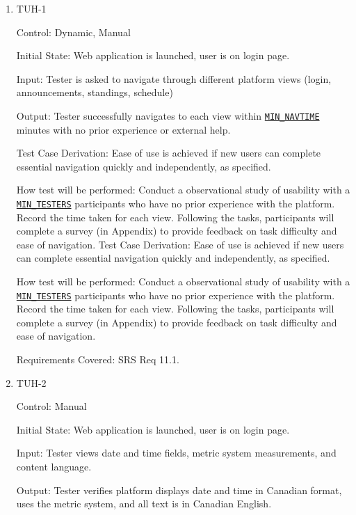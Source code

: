 \documentclass[12pt, titlepage]{article}
\begin{document}
\begin{enumerate}

  \item{TUH-1\\}

        Control: Dynamic, Manual

        Initial State:  Web application is launched, user is on login page.

        Input: Tester is asked to navigate through different platform views (login, announcements, standings, schedule)

        Output: Tester successfully navigates to each view within \hyperref[MIN_NAVTIME]{\texttt{MIN\_NAVTIME}} minutes with no prior experience or external help.

        Test Case Derivation: Ease of use is achieved if new users can complete essential navigation quickly and independently, as specified.

        How test will be performed: Conduct a observational study of usability with a \hyperref[MIN_TESTERS]{\texttt{MIN\_TESTERS}} participants who have no prior experience with the platform. Record the time taken for each view. Following the tasks, participants will complete a survey (in Appendix) to provide feedback on task difficulty and ease of navigation.
Test Case Derivation: Ease of use is achieved if new users can complete essential navigation quickly and independently, as specified.
					
How test will be performed: Conduct a observational study of usability with a \hyperref[MIN_TESTERS]{\texttt{MIN\_TESTERS}} participants who have no prior experience with the platform. Record the time taken for each view. Following the tasks, participants will complete a survey (in Appendix) to provide feedback on task difficulty and ease of navigation.

Requirements Covered: SRS Req 11.1.

\item{TUH-2\\}

        Control: Manual

        Initial State:  Web application is launched, user is on login page.

        Input: Tester views date and time fields, metric system measurements, and content language.

        Output: Tester verifies platform displays date and time in Canadian format, uses the metric system, and all text is in Canadian English.


\end{enumerate}
\end{document}
